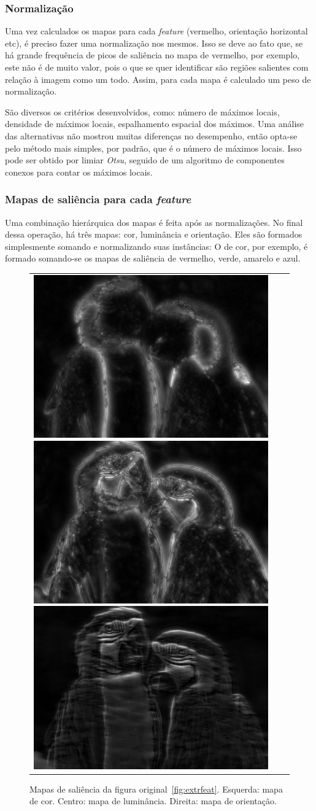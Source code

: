 \documentclass[article]{IEEEtran}
\newcommand{\tit}[1]{\textit{#1}}
\begin{document}
\subsubsection{Normalização}
Uma vez calculados os mapas para cada \tit{feature} (vermelho,
orientação horizontal etc), é preciso fazer uma normalização nos mesmos.
Isso se deve ao fato que, se há grande frequência de picos de saliência
no mapa de vermelho, por exemplo, este não é de muito valor, pois o que se
quer identificar são regiões salientes com relação à imagem como um todo.
Assim, para cada mapa é calculado um peso de normalização.

São diversos os critérios desenvolvidos, como: número de máximos locais,
densidade de máximos locais, espalhamento espacial dos máximos.
Uma análise das alternativas não mostrou muitas diferenças no desempenho,
então opta-se pelo método mais simples, por padrão, que é o número de máximos
locais. Isso pode ser obtido por limiar \tit{Otsu}, seguido de um algoritmo
de componentes conexos para contar os máximos locais.

\subsubsection{Mapas de saliência para cada \tit{feature}}
Uma combinação hierárquica dos mapas é feita após as normalizações.
No final dessa operação, há três mapas: cor, luminância
e orientação.
Eles são formados simplesmente somando e normalizando suas instâncias:
O de cor, por exemplo, é formado somando-se os mapas de saliência de
vermelho, verde, amarelo e azul.
\begin{figure}[hbt]
\begin{center}
		\begin{tabular} {ccc}
            \includegraphics[width=0.3\linewidth]{img/arara_col_map.png}
            \includegraphics[width=0.3\linewidth]{img/arara_cst_map.png}
            \includegraphics[width=0.3\linewidth]{img/arara_ort_map.png}
		\end{tabular}
\end{center}
\caption{Mapas de saliência da figura original~\ref{fig:extrfeat}.
    Esquerda: mapa de cor. Centro: mapa de luminância. Direita: mapa de
orientação.}
\label{fig:maps}
\end{figure}
\end{document}
